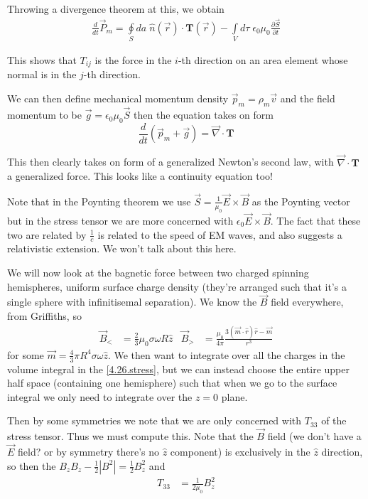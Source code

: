 \documentclass[10pt]{report}
\newcommand{\rd}[2]{\frac{d#1}{d#2}}
\newcommand{\pd}[2]{\frac{\partial #1}{\partial#2}}
\newcommand{\abs}[1]{\left|#1\right|}
\begin{document}
Throwing a divergence theorem at this, we obtain
\begin{align}
    \rd{}{t}\vec{P}_{m} = \oint\limits_{S}^{}da\; \hat{n}(\vec{r}) \cdot \mathbf{T}(\vec{r}) - \int\limits_{V}^{}d\tau\;\epsilon_0\mu_0\pd{\vec{S}}{t}
\end{align}

This shows that $T_{ij}$ is the force in the $i$-th direction on an area element whose normal is in the $j$-th direction.

We can then define mechanical momentum density $\vec{p}_m = \rho_m\vec{v}$ and the field momentum to be $\vec{g} =\epsilon_0 \mu_0 \vec{S}$ then the equation takes on form
\begin{equation}
    \rd{}{t}\left( \vec{p}_m + \vec{g} \right) = \vec{\nabla} \cdot \mathbf{T}
\end{equation}

This then clearly takes on form of a generalized Newton's second law, with $\vec{\nabla} \cdot \mathbf{T}$ a generalized force. This looks like a continuity equation too!

Note that in the Poynting theorem we use $\vec{S} = \frac{1}{\mu_0}\vec{E} \times \vec{B}$ as the Poynting vector but in the stress tensor we are more concerned with $\epsilon_0 \vec{E} \times \vec{B}$. The fact that these two are related by $\frac{1}{c}$ is related to the speed of EM waves, and also suggests a relativistic extension. We won't talk about this here.

We will now look at the bagnetic force between two charged spinning hemispheres, uniform surface charge density (they're arranged such that it's a single sphere with infinitisemal separation). We know the $\vec{B}$ field everywhere, from Griffiths, so
\begin{align}
    \vec{B}_< &= \frac{2}{3}\mu_0 \sigma \omega R\hat{z} & \vec{B}_> &= \frac{\mu_0}{4\pi}\frac{3(\vec{m} \cdot \hat{r})\hat{r} - \vec{m}}{r^3}
\end{align}
for some $\vec{m} = \frac{4}{3}\pi R^4 \sigma \omega \hat{z}$. We then want to integrate over all the charges in the volume integral in the \eqref{4.26.stress}, but we can instead choose the entire upper half space (containing one hemisphere) such that when we go to the surface integral we only need to integrate over the $z=0$ plane. 

Then by some symmetries we note that we are only concerned with $T_{33}$ of the stress tensor. Thus we must compute this. Note that the $\vec{B}$ field (we don't have a $\vec{E}$ field? or by symmetry there's no $\hat{z}$ component) is exclusively in the $\hat{z}$ direction, so then the $B_zB_z - \frac{1}{2}\abs{B^2} = \frac{1}{2}B_z^2$ and
\begin{align}
    T_{33} &= \frac{1}{2\mu_0}B_z^2
\end{align}
\end{document}
